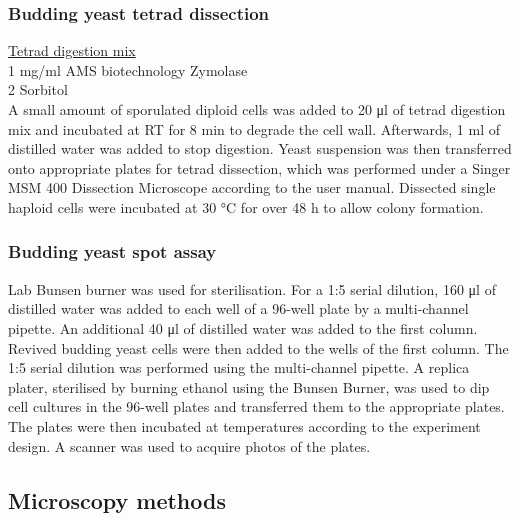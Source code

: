 \subsubsection{Budding yeast tetrad dissection}

\underline{Tetrad digestion mix}\\
1 \si{\milli\gram/\milli\litre} AMS biotechnology Zymolase\\
2 \si{\Molar} Sorbitol \\

A small amount of sporulated diploid cells was added to 20 \si{\micro\litre} of tetrad digestion mix and incubated at RT for 8 \si{\minute} to degrade the cell wall. Afterwards, 1 \si{\milli\litre} of distilled water was added to stop digestion. Yeast suspension was then transferred onto appropriate plates for tetrad dissection, which was performed under a Singer MSM 400 Dissection Microscope according to the user manual. Dissected single haploid cells were incubated at 30 \si{\celsius} for over 48 \si{\hour} to allow colony formation. 

\subsubsection{Budding yeast spot assay}

Lab Bunsen burner was used for sterilisation. For a 1:5 serial dilution, 160 \si{\micro\litre} of distilled water was added to each well of a 96-well plate by a multi-channel pipette. An additional 40 \si{\micro\litre} of distilled water was added to the first column. Revived budding yeast cells were then added to the wells of the first column. The 1:5 serial dilution was performed using the multi-channel pipette. A replica plater, sterilised by burning ethanol using the Bunsen Burner, was used to dip cell cultures in the 96-well plates and transferred them to the appropriate plates. The plates were then incubated at temperatures according to the experiment design. A scanner was used to acquire photos of the plates. 

\subsection{Microscopy methods}
